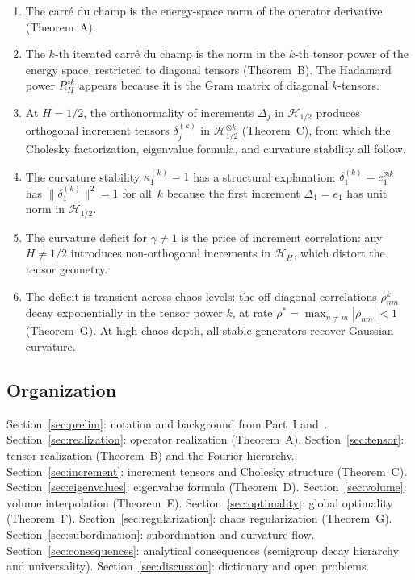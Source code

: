 \documentclass[11pt,a4paper]{article}
\theoremstyle{plain}
\theoremstyle{definition}
\theoremstyle{remark}
\newcommand{\HH}{\mathcal{H}_H}
\begin{document}
\begin{enumerate}[label=(\alph*)]
\item The carr\'e du champ is the energy-space norm of
  the operator derivative (Theorem~A).

\item The $k$-th iterated carr\'e du champ is the
  norm in the $k$-th tensor power of the energy space,
  restricted to diagonal tensors (Theorem~B).
  The Hadamard power $R_H^{\circ k}$ appears because
  it is the Gram matrix of diagonal $k$-tensors.

\item At $H = 1/2$, the orthonormality of increments
  $\Delta_j$ in $\mathcal{H}_{1/2}$ produces
  orthogonal increment tensors $\delta_j^{(k)}$ in
  $\mathcal{H}_{1/2}^{\otimes k}$ (Theorem~C),
  from which the Cholesky factorization, eigenvalue
  formula, and curvature stability all follow.

\item The curvature stability $\kappa_1^{(k)} = 1$
  has a structural explanation:
  $\delta_1^{(k)} = e_1^{\otimes k}$ has
  $\|\delta_1^{(k)}\|^2 = 1$ for all~$k$
  because the first increment $\Delta_1 = e_1$ has
  unit norm in $\mathcal{H}_{1/2}$.

\item The curvature deficit for $\gamma \neq 1$ is
  the price of increment correlation: any
  $H \neq 1/2$ introduces non-orthogonal increments
  in $\HH$, which distort the tensor geometry.

\item The deficit is transient across chaos levels:
  the off-diagonal correlations $\rho_{nm}^k$ decay
  exponentially in the tensor power $k$, at rate
  $\rho^* = \max_{n \neq m}|\rho_{nm}| < 1$
  (Theorem~G).  At high chaos depth, all stable
  generators recover Gaussian curvature.
\end{enumerate}


\subsection{Organization}

Section~\ref{sec:prelim}: notation and background
from Part~I and~\cite{Fontes2026opderiv}.
Section~\ref{sec:realization}: operator realization
(Theorem~A).
Section~\ref{sec:tensor}: tensor realization
(Theorem~B) and the Fourier hierarchy.
Section~\ref{sec:increment}: increment tensors and
Cholesky structure (Theorem~C).
Section~\ref{sec:eigenvalues}: eigenvalue formula
(Theorem~D).
Section~\ref{sec:volume}: volume interpolation
(Theorem~E).
Section~\ref{sec:optimality}: global optimality
(Theorem~F).
Section~\ref{sec:regularization}: chaos regularization
(Theorem~G).
Section~\ref{sec:subordination}: subordination and
curvature flow.
Section~\ref{sec:consequences}: analytical consequences
(semigroup decay hierarchy and universality).
Section~\ref{sec:discussion}: dictionary and open problems.
\end{document}
